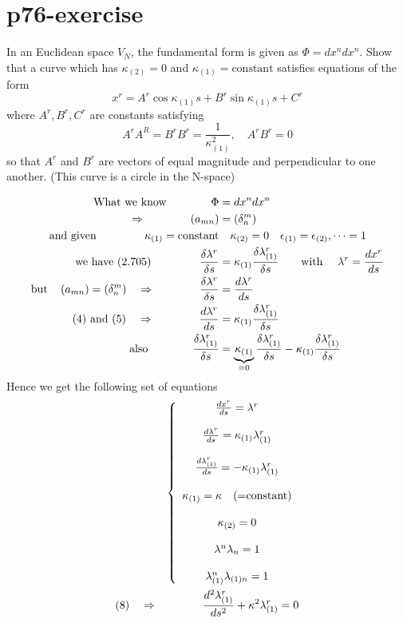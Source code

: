 \section{p76-exercise}
\begin{tcolorbox}
In an Euclidean space $V_N$, the fundamental form is given as $\Phi = dx^n dx^n$. Show that a curve which has $\kappa_{(2)} = 0$ and $\kappa_{(1)} = \text{constant}$ satisfies equations of the form
$$x^r = A^r\cos\kappa_{(1)}s + B^r\sin\kappa_{(1)}s + C^r$$ where $A^r, B^r, C^r$ are constants satisfying $$ A^rA^R = B^rB^r = \frac{1}{\kappa_{(1)}^2},\quad A^rB^r = 0$$
so that $A^r$ and $B^r$ are vectors of equal magnitude and perpendicular to one another. (This curve is a circle in the N-space)
\end{tcolorbox}
\begin{align}
\text{What we know}\quad\quad\quad\quad \Phi &= dx^n dx^n\\
\Rightarrow \quad\quad\quad\quad \left(a_{mn}\right) &= \left(\delta^m_n\right)\\
\text{and given } \quad\quad\quad\quad \kappa_{(1)} = \text{constant}& \quad \kappa_{(2)} = 0\quad \epsilon_{(1)}=\epsilon_{(2)}, \dots = 1\\
\text{we have (2.705) }\quad\quad\quad\quad \frac{\delta\lambda^r}{\delta s}&=  \kappa_{(1)} \frac{\delta\lambda_{(1)}^r}{\delta s} \quad \quad \text{with }\quad \lambda^r = \dv{x^r}{s}\\
\text{but}\quad\left(a_{mn}\right) = \left(\delta^m_n\right)\quad\Rightarrow\quad\quad\quad\quad \frac{\delta\lambda^r}{\delta s} &= \dv{\lambda^r}{s}\\
\text{(4) and (5)}\quad\Rightarrow\quad\quad\quad\quad \dv{\lambda^r}{s} &= \kappa_{(1)} \frac{\delta\lambda_{(1)}^r}{\delta s}\\
\text{also}\quad\quad\quad\quad \frac{\delta\lambda_{(1)}^r}{\delta s} &= \underbrace{\kappa_{(1)}}_{=0} \frac{\delta\lambda_{(1)}^r}{\delta s}-  \kappa_{(1)} \frac{\delta\lambda_{(1)}^r}{\delta s}
\end{align}
Hence we get the following set of equations
\begin{align}
\left \{ \begin{array}{c}
\dv{x^r}{s} = \lambda^r \\\\
\dv{\lambda^r}{s} = \kappa_{(1)} \lambda_{(1)}^r\\\\
\dv{\lambda_{(1)}^r}{ s} = -  \kappa_{(1)} \lambda_{(1)}^r\\\\
\kappa_{(1)} = \kappa\quad \text{(=constant)}\\\\
\kappa_{(2)} = 0\\\\
\lambda^n\lambda_n = 1\\\\
\lambda_{(1)}^n\lambda_{(1)n} = 1\\
\end{array} \right.\\
\text{(8)}\quad \Rightarrow \quad\quad\quad\quad \dv[2]{\lambda_{(1)}^r}{s} + \kappa ^2 \lambda_{(1)}^r = 0
\end{align}
